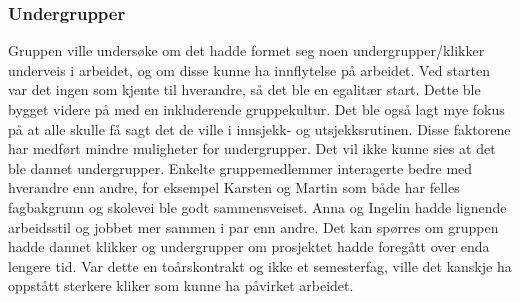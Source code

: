 \subsubsection{Undergrupper}

Gruppen ville undersøke om det hadde formet seg noen undergrupper/klikker underveis i arbeidet, og om disse kunne ha innflytelse på arbeidet.
Ved starten var det ingen som kjente til hverandre, så det ble en egalitær start.
Dette ble bygget videre på med en inkluderende gruppekultur. Det ble også lagt mye fokus på at alle skulle få sagt det de ville i innsjekk- og utsjekksrutinen. 
Disse faktorene har medført mindre muligheter for undergrupper. 
Det vil ikke kunne sies at det ble dannet undergrupper. 
Enkelte gruppemedlemmer interagerte bedre med hverandre enn andre, for eksempel Karsten og Martin som både har felles fagbakgrunn og skolevei ble godt sammensveiset. Anna og Ingelin hadde lignende arbeidsstil og jobbet mer sammen i par enn andre. 
Det kan spørres om gruppen hadde dannet klikker og undergrupper om prosjektet hadde foregått over enda lengere tid.
Var dette en toårskontrakt og ikke et semesterfag, ville det kanskje ha oppstått sterkere kliker som kunne ha påvirket arbeidet. 
\\